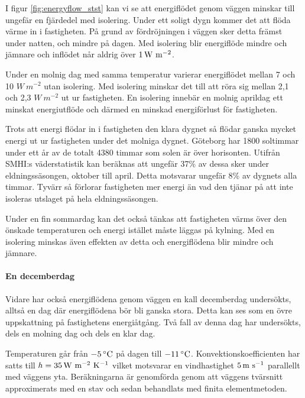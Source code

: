 I figur \ref{fig:energyflow_stst} kan vi se att energiflödet genom väggen minskar till 
ungefär en fjärdedel med isolering. Under ett soligt dygn kommer det att flöda värme in i
 fastigheten. På grund av fördröjningen i väggen sker detta främst under natten, 
 och mindre på dagen. Med isolering blir energiflöde mindre och jämnare och inflödet når aldrig över $\unit[1]{W~m^{-2}}$.

Under en molnig dag med samma temperatur varierar energiflödet mellan 7 och 10 
$\unit{W~m^{-2}}$ utan isolering. Med isolering minskar det till att röra sig mellan 2,1 och 2,3 $\unit{W~m^{-2}}$ ut ur 
fastigheten. En isolering innebär en molnig aprildag ett minskat energiutflöde och därmed en minskad 
energiförlust för fastigheten.

Trots att energi flödar in i fastigheten den klara dygnet så flödar ganska mycket energi 
ut ur fastigheten under det molniga dygnet. Göteborg har 1800 soltimmar under ett
 år av de totalt 4380 timmar som solen är över horisonten. Utifrån SMHI:s väderstatistik \cite{SMHIdata}
 kan beräknas att ungefär 37\% av dessa sker under eldningssäsongen, oktober till april. 
 Detta motsvarar ungefär 8\% av dygnets alla timmar. Tyvärr så förlorar fastigheten mer 
 energi än vad den tjänar på att inte isoleras utslaget på hela eldningssäsongen.

Under en fin sommardag kan det också tänkas att fastigheten värms över den önskade 
temperaturen och energi istället måste läggas på kylning. Med en isolering minskas även 
effekten av detta och energiflödena blir mindre och jämnare.

\paragraph{En decemberdag}

Vidare har också energiflödena genom väggen en kall decemberdag undersökts, 
alltså en dag där energiflödena bör bli ganska stora. Detta kan ses som en övre uppskattning på fastighetens energiåtgång. Två fall av
denna dag har undersökts, dels en molning dag och dels en klar dag.

 Temperaturen går från $\unit[-5]{^\circ C}$ på dagen till $\unit[-11]{^\circ C}$. 
 Konvektionskoefficienten har satts till $h=\unit[35]{W~m^{-2}~K^{-1}}$ 
 vilket motsvarar en vindhastighet $\unit[5]{m~s^{-1}}$ parallellt med väggens yta. 
 Beräkningarna är genomförda genom att väggens tvärsnitt approximerats med en stav och sedan behandlats med finita elementmetoden.


